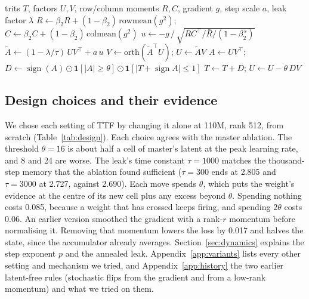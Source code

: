 \documentclass[10pt,twocolumn]{article}
\newcommand{\sign}{\operatorname{sign}}
\begin{document}
\begin{algorithm}[t]
\caption{TTF update for one ternary layer (inside its backward pass)}
\label{alg:ttf}
\begin{algorithmic}[1]
\Require trits $T$, factors $U,V$, row/column moments $R,C$, gradient $g$, step scale $a$, leak factor $\lambda$
\State $R\gets\beta_2R+(1-\beta_2)\,\mathrm{rowmean}(g^2)$;\; $C\gets\beta_2C+(1-\beta_2)\,\mathrm{colmean}(g^2)$
\State $u\gets -g\,/\,\sqrt{RC^\top/\bar R/(1-\beta_2^{\,s})}$ 
\State $\tilde A \gets (1-\lambda/\tau)\,UV^\top + a\,u$ 
\State $V\gets\mathrm{orth}(\tilde A^\top U)$;\; $U\gets\tilde A V$
\State $A\gets UV^\top$;\; $D\gets \sign(A)\odot\mathbf 1[|A|\ge\theta]\odot\mathbf 1[|T+\sign A|\le1]$
\State $T\gets T+D$;\; $U\gets U-\theta\,DV$
\end{algorithmic}
\end{algorithm}

\subsection{Design choices and their evidence}\label{sec:design}
We chose each setting of TTF by changing it alone at 110M, rank 512, from scratch (Table~\ref{tab:design}). Each choice
agrees with the master ablation. The threshold $\theta=16$ is about half a cell of master's latent at the peak learning
rate, and 8 and 24 are worse. The leak's time constant $\tau=1000$ matches the thousand-step memory that the ablation
found sufficient ($\tau=300$ ends at 2.805 and $\tau=3000$ at 2.727, against 2.690). Each move spends $\theta$, which puts the weight's evidence at
the centre of its new cell plus any excess beyond $\theta$. Spending nothing costs 0.085, because a weight that has
crossed keeps firing, and spending $2\theta$ costs 0.06. An earlier version smoothed the gradient with a rank-$r$ momentum
before normalising it. Removing that momentum lowers the loss by 0.017 and halves the state, since the accumulator
already averages. Section~\ref{sec:dynamics} explains the step exponent $p$ and the annealed leak.
Appendix~\ref{app:variants} lists every other setting and mechanism we tried, and Appendix~\ref{app:history} the two
earlier latent-free rules (stochastic flips from the gradient and from a low-rank momentum) and what we tried on them.
\end{document}
